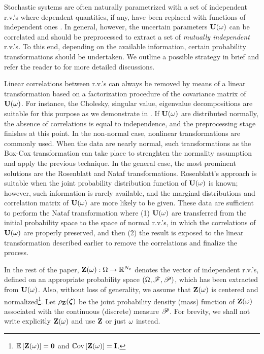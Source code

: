 Stochastic systems are often naturally parametrized with a set of independent r.v.'s where dependent quantities, if any, have been replaced with functions of independent ones \cite{xiu2009}. In general, however, the uncertain parameters $\mathbf{U}(\omega)$ can be correlated and should be preprocessed to extract a set of \emph{mutually independent} r.v.'s. To this end, depending on the available information, certain probability transformations should be undertaken. We outline a possible strategy in brief and refer the reader to \cite{eldred2009, xiu2009} for more detailed discussions.

Linear correlations between r.v.'s can always be removed by means of a linear transformation based on a factorization procedure of the covariance matrix of $\mathbf{U}(\omega)$. For instance, the Cholesky, singular value, eigenvalue decompositions \cite{press2007} are suitable for this purpose as we demonstrate in . If $\mathbf{U}(\omega)$ are distributed normally, the absence of correlations is equal to independence, and the preprocessing stage finishes at this point. In the non-normal case, nonlinear transformations are commonly used. When the data are nearly normal, such transformations as the Box-Cox transformation \cite{box1964} can take place to strenghten the normality assumption and apply the previous technique. In the general case, the most prominent solutions are the Rosenblatt \cite{rosenblatt1952} and Nataf \cite{hongshuang2008} transformations. Rosenblatt's approach is suitable when the joint probability distribution function of $\mathbf{U}(\omega)$ is known; however, such information is rarely available, and the marginal distributions and correlation matrix of $\mathbf{U}(\omega)$ are more likely to be given. These data are sufficient to perform the Nataf transformation where (1) $\mathbf{U}(\omega)$ are transferred from the initial probability space to the space of normal r.v.'s, in which the correlations of $\mathbf{U}(\omega)$ are properly preserved, and then (2) the result is exposed to the linear transformation described earlier to remove the correlations and finalize the process.

In the rest of the paper, $\mathbf{Z}(\omega): \Omega \to \mathbb{R}^{N_\text{v}}$ denotes the vector of independent r.v.'s, defined on an appropriate probability space $(\Omega, \mathscr{F}, \mathscr{P})$, which has been extracted from $\mathbf{U}(\omega)$. Also, without loss of generality, we assume that $\mathbf{Z}(\omega)$ is centered and normalized\footnote{$\oExp{\vZ(\o)} = \mZero$ and $\oCov{\vZ(\o)} = \mI$.}. Let $\rho_{\mathbf{Z}}(\boldsymbol{\zeta})$ be the joint probability density (mass) function of $\mathbf{Z}(\omega)$ associated with the continuous (discrete) measure $\mathscr{P}$. For brevity, we shall not write explicitly $\mathbf{Z}(\omega)$ and use $\mathbf{Z}$ or just $\omega$ instead.
